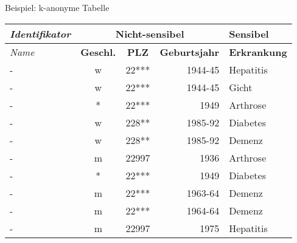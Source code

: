 \begin{frame}{Beispiel: k-anonyme Tabelle}
	\begin{center}
		\begin{tabular}{|l|c|c|r|l|}
		\hline \textit{Identifikator} & \multicolumn{3}{c|}{\textbf{Nicht-sensibel}} & \textbf{Sensibel} \\ 
		\hline \textit{Name} & \textbf{Geschl.} & \textbf{PLZ} & \textbf{Geburtsjahr} & \textbf{Erkrankung} \\ \hline
		\hline \rowcolor{svshellblau1!30} - & w & 22*** & 1944-45 & Hepatitis \\ 
		\hline \rowcolor{svshellblau1!30} - & w & 22*** & 1944-45 & Gicht \\
		\hline \rowcolor{svsgrau1!30} - & * & 22*** & 1949 & Arthrose \\ 
		\hline \rowcolor{svshellblau2!30} - & w & 228** & 1985-92 & Diabetes \\ 
		\hline \rowcolor{svshellblau2!30} - & w & 228** & 1985-92 & Demenz \\  
		\hline - & m & 22997 & 1936 & Arthrose \\ 
		\hline \rowcolor{svsgrau1!30}- & * & 22*** & 1949 & Diabetes \\ 
		\hline \rowcolor{svsrot!30} - & m & 22*** & 1963-64 & Demenz \\ 
		\hline \rowcolor{svsrot!30} - & m & 22*** & 1964-64 & Demenz \\ 
		\hline - & m & 22997 & 1975 & Hepatitis \\ 
		\hline 
		\end{tabular}
	\end{center}
\end{frame}

